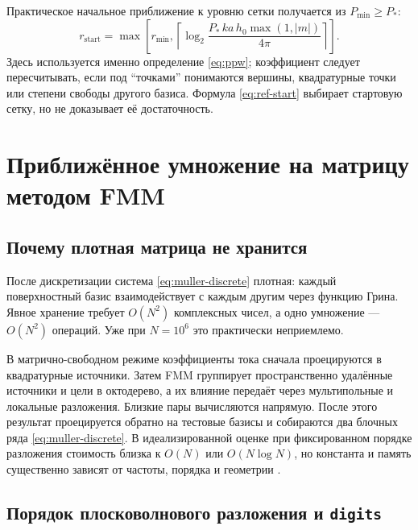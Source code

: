 \documentclass[12pt,a4paper]{article}
\begin{document}
Практическое начальное приближение к уровню сетки получается из
$P_{\min}\ge P_*$:
\begin{equation}
  r_{\mathrm{start}}=
  \max\left[r_{\min},
  \left\lceil\log_2
  \frac{P_*\,ka\,h_0\max(1,|m|)}{4\pi}
  \right\rceil\right].
  \label{eq:ref-start}
\end{equation}
Здесь используется именно определение \eqref{eq:ppw}; коэффициент следует
пересчитывать, если под ``точками'' понимаются вершины, квадратурные точки или
степени свободы другого базиса. Формула \eqref{eq:ref-start} выбирает стартовую
сетку, но не доказывает её достаточность.

\section{Приближённое умножение на матрицу методом FMM}

\subsection{Почему плотная матрица не хранится}

После дискретизации система \eqref{eq:muller-discrete} плотная: каждый
поверхностный базис взаимодействует с каждым другим через функцию Грина. Явное
хранение требует $O(N^2)$ комплексных чисел, а одно умножение --- $O(N^2)$
операций. Уже при $N=10^6$ это практически неприемлемо.

В матрично-свободном режиме коэффициенты тока сначала проецируются в
квадратурные источники. Затем FMM группирует пространственно удалённые источники
и цели в октодерево, а их влияние передаёт через мультипольные и локальные
разложения. Близкие пары вычисляются напрямую. После этого результат
проецируется обратно на тестовые базисы и собираются два блочных ряда
\eqref{eq:muller-discrete}. В идеализированной оценке при фиксированном порядке
разложения стоимость близка к $O(N)$ или $O(N\log N)$, но константа и память
существенно зависят от частоты, порядка и геометрии
\cite{greengard1987,darve2000,chew2001}.

\subsection{Порядок плосковолнового разложения и \texttt{digits}}
\end{document}
